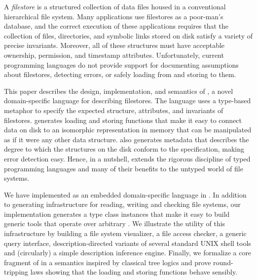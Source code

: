 A {\em filestore} is a structured collection of data files housed in a
conventional hierarchical file system. Many applications use filestores
as a poor-man's database, and the correct execution of these
applications requires that the collection of files, directories, and
symbolic links stored on disk satisfy a variety of precise
invariants. Moreover, all of these structures must have acceptable
ownership, permission, and timestamp attributes. Unfortunately,
current programming languages do not provide support for documenting
assumptions about filestores, detecting errors, or safely loading from
and storing to them.

This paper describes the design, implementation, and semantics of
\forest{}, a novel domain-specific language for describing
filestores. The language uses a type-based metaphor to specify the
expected structure, attributes, and invariants of filestores.
\forest{} generates loading and storing functions that make it easy to
connect data on disk to an isomorphic representation in memory that
can be manipulated as if it were any other data structure.  \forest{}
also generates metadata that describes the degree to which the
structures on the disk conform to the specification, making error
detection easy. Hence, in a nutshell, \forest{} extends the
rigorous discipline of typed 
programming languages and many of their benefits to the untyped 
world of file systems.

We have implemented \forest{} as an embedded domain-specific language
in \haskell{}. In addition to generating infrastructure for reading,
writing and checking file systems, our implementation generates a
type class instances that make it easy to build generic tools that
operate over arbitrary \filestores.  We illustrate the utility of
this infrastructure by building a file system visualizer, a file access
checker, a generic query interface, description-directed variants of 
several standard UNIX shell tools and (circularly) a simple \forest{}
description inference engine.   Finally, we formalize a core fragment 
of \forest{} in a
semantics inspired by classical tree logics and prove round-tripping
laws showing that the loading and storing functions behave sensibly.
